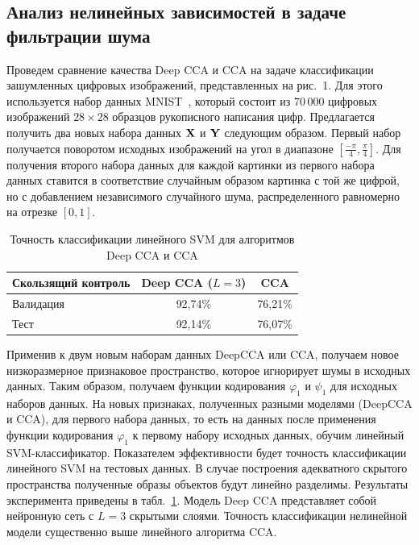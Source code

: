 \subsection{Анализ нелинейных зависимостей в задаче фильтрации шума}

Проведем сравнение качества Deep CCA и CCA на задаче классификации зашумленных цифровых изображений, представленных на рис.~1. Для этого используется набор данных MNIST~\cite{MNIST}, который состоит из 70\,000 цифровых изображений $28 \times 28$ образцов рукописного написания цифр. Предлагается получить два новых набора данных $\mathbf{X}$ и $\mathbf{Y}$ следующим образом. Первый набор получается поворотом исходных изображений на угол в диапазоне $[\frac{-\pi}{4}, \frac{\pi}{4}]$. Для получения второго набора данных для каждой картинки из первого набора данных ставится в соответствие случайным образом картинка с той же цифрой, но с добавлением независимого случайного шума, распределенного равномерно на отрезке $[0,1]$.

\begin{table}[!bp]
\caption{Точность классификации линейного SVM для алгоритмов Deep CCA и CCA}
\centering
\begin{tabular}{l|cc}
\hline
	Скользящий контроль & Deep CCA ($L=3$) & CCA \\  \hline
	Валидация & 92,74\%  &  76,21\%\\
	Тест & 92,14\% & 76,07\% \\
	\hline
\end{tabular}
\label{tbl:1}
\end{table}

Применив к двум новым наборам данных DeepCCA или CCA, получаем новое низкоразмерное признаковое пространство, которое игнорирует шумы в исходных данных. Таким образом, получаем функции кодирования $\varphi_1$ и $\psi_1$ для исходных наборов данных. На новых признаках, полученных разными моделями (DeepCCA и CCA), для первого набора данных, то есть на данных после применения функции кодирования $\varphi_1$ к первому набору исходных данных, обучим линейный SVM-классификатор. Показателем эффективности будет точность классификации линейного SVM на тестовых данных. В случае построения адекватного скрытого пространства полученные образы объектов будут линейно разделимы. Результаты эксперимента приведены в табл.~\ref{tbl:1}. Модель Deep CCA представляет собой нейронную сеть с $L=3$ скрытыми слоями. Точность классификации нелинейной модели существенно выше линейного алгоритма CCA.

